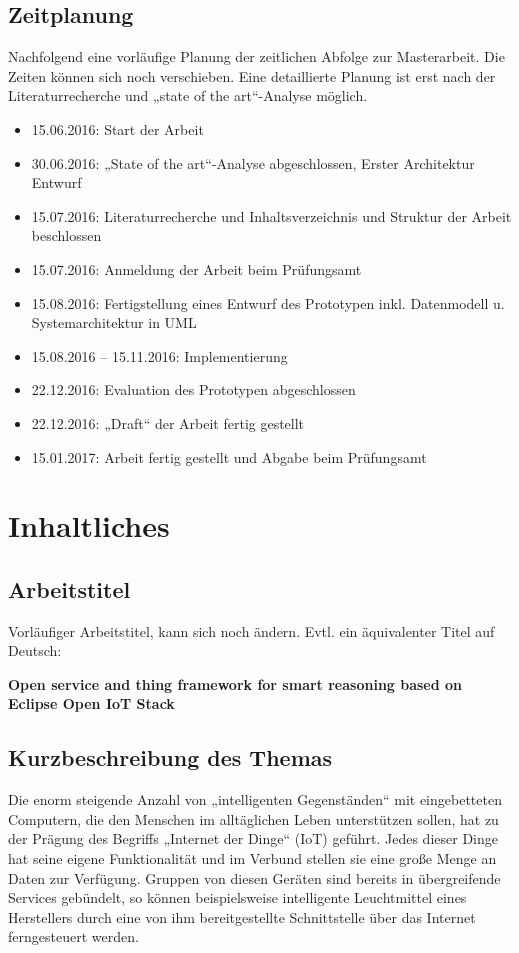 \documentclass[12pt]{article}
\begin{document}
\subsection{Zeitplanung}
Nachfolgend eine vorläufige Planung der zeitlichen Abfolge zur Masterarbeit. Die Zeiten können sich noch verschieben. Eine detaillierte Planung ist erst nach der Literaturrecherche und „state of the art“-Analyse möglich.
\begin{itemize}
	\item 15.06.2016: Start der Arbeit
	\item 30.06.2016: „State of the art“-Analyse abgeschlossen, Erster Architektur Entwurf
	\item 15.07.2016: Literaturrecherche und Inhaltsverzeichnis und Struktur der Arbeit beschlossen
	\item 15.07.2016: Anmeldung der Arbeit beim Prüfungsamt
	\item 15.08.2016: Fertigstellung eines Entwurf des Prototypen inkl. Datenmodell u. Systemarchitektur in UML
	\item 15.08.2016 – 15.11.2016: Implementierung
	\item 22.12.2016: Evaluation des Prototypen abgeschlossen
	\item 22.12.2016: „Draft“ der Arbeit fertig gestellt
	\item 15.01.2017: Arbeit fertig gestellt und Abgabe beim Prüfungsamt
\end{itemize}



\section{Inhaltliches}
\subsection{Arbeitstitel}
Vorläufiger Arbeitstitel, kann sich noch ändern. Evtl. ein äquivalenter Titel auf Deutsch:

\textbf{Open service and thing framework for smart reasoning based on Eclipse Open IoT Stack}


\subsection{Kurzbeschreibung des Themas}
Die enorm steigende Anzahl von „intelligenten Gegenständen“ mit eingebetteten Computern, die den Menschen im alltäglichen Leben unterstützen sollen, hat zu der Prägung des Begriffs „Internet der Dinge“ (IoT) geführt. Jedes dieser Dinge hat seine eigene Funktionalität und im Verbund stellen sie eine große Menge an Daten zur Verfügung. Gruppen von diesen Geräten sind bereits in übergreifende Services gebündelt, so können beispielsweise intelligente Leuchtmittel eines Herstellers durch eine von ihm bereitgestellte Schnittstelle über das Internet ferngesteuert werden. 
\end{document}
